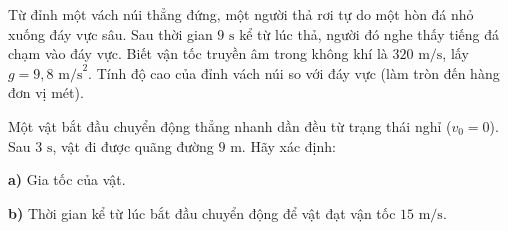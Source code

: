 \begin{ex}
	Từ đỉnh một vách núi thẳng đứng, một người thả rơi tự do một hòn đá nhỏ xuống đáy vực sâu. Sau thời gian $9\text{ s}$ kể từ lúc thả, người đó nghe thấy tiếng đá chạm vào đáy vực. Biết vận tốc truyền âm trong không khí là $320\text{ m/s}$, lấy $g = 9{,}8\text{ m/s}^2$. Tính độ cao của đỉnh vách núi so với đáy vực (làm tròn đến hàng đơn vị mét).
\end{ex}

\begin{ex}
	Một vật bắt đầu chuyển động thẳng nhanh dần đều từ trạng thái nghỉ ($v_0 = 0$). Sau $3\text{ s}$, vật đi được quãng đường $9\text{ m}$. Hãy xác định:
	\par \textbf{a)} Gia tốc của vật. \par \textbf{b)} Thời gian kể từ lúc bắt đầu chuyển động để vật đạt vận tốc $15\text{ m/s}$.
\end{ex}
